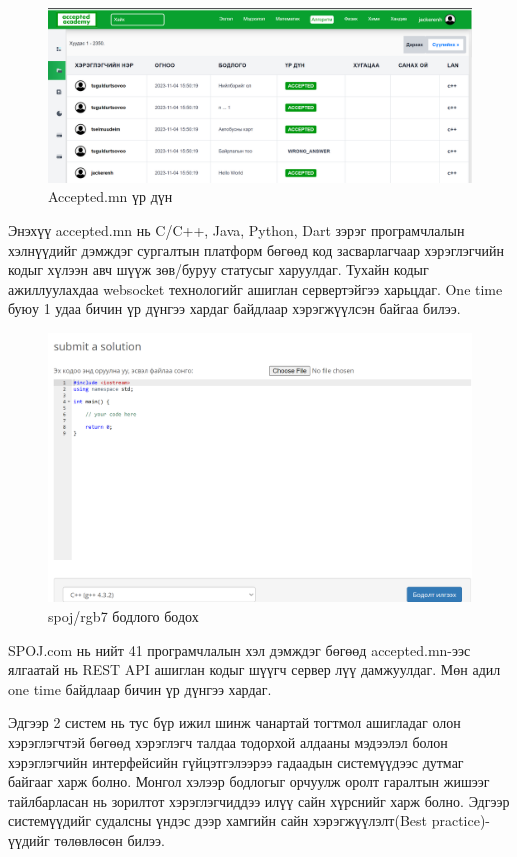 \begin{figure}[h]
  \centering
  \includegraphics[width=15cm]{img/accepted-judger.PNG}
  \caption{Accepted.mn үр дүн}
\end{figure}

Энэхүү accepted.mn нь C/C++, Java, Python, Dart зэрэг програмчлалын хэлнүүдийг дэмждэг сургалтын платформ бөгөөд код засварлагчаар хэрэглэгчийн кодыг хүлээн авч шүүж зөв/буруу статусыг харуулдаг. Тухайн кодыг ажиллуулахдаа websocket технологийг ашиглан сервертэйгээ харьцдаг. One time буюу 1 удаа бичин үр дүнгээ хардаг байдлаар хэрэгжүүлсэн байгаа билээ. 

\begin{figure}[h]
  \centering
  \includegraphics[width=15cm]{img/spoj.PNG}
  \caption{spoj/rgb7 бодлого бодох}
\end{figure}

SPOJ.com нь нийт 41 програмчлалын хэл дэмждэг бөгөөд accepted.mn-ээс ялгаатай нь REST API ашиглан кодыг шүүгч сервер лүү дамжуулдаг. Мөн адил one time байдлаар бичин үр дүнгээ хардаг. 

Эдгээр 2 систем нь тус бүр ижил шинж чанартай тогтмол ашигладаг олон хэрэглэгчтэй бөгөөд хэрэглэгч талдаа тодорхой алдааны мэдээлэл болон хэрэглэгчийн интерфейсийн гүйцэтгэлээрээ гадаадын системүүдээс дутмаг байгааг харж болно. Монгол хэлээр бодлогыг орчуулж оролт гаралтын жишээг тайлбарласан нь зорилтот хэрэглэгчиддээ илүү сайн хүрснийг харж болно. Эдгээр системүүдийг судалсны үндэс дээр хамгийн сайн хэрэгжүүлэлт(Best practice)-үүдийг төлөвлөсөн билээ.

